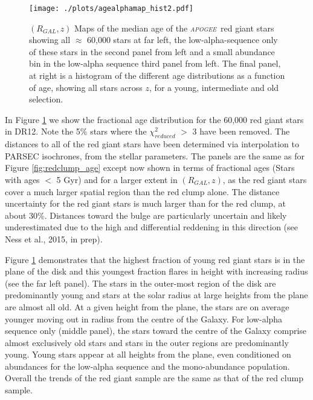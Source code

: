 \documentclass[12pt, preprint]{aastex}
\newcommand{\project}[1]{\textsl{#1}}
\newcommand{\apogee}{\project{\textsc{apogee}}}
\begin{document}
\begin{figure}[p]
\centering
              \texttt{[image: ./plots/agealphamap\_hist2.pdf]}
    \caption{$(R_{GAL},z)$ Maps of the median age of the \apogee\  red giant stars showing all $\approx$ 60,000 stars at far left, the low-alpha-sequence only of these stars in the second panel from left and a small abundance bin in the low-alpha sequence third panel from left. The final panel, at right is a histogram of the different age distributions as a function of age, showing all stars across $z$, for a young, intermediate and old selection.  }
\label{fig:allage}
\end{figure}

In Figure \ref{fig:allage} we show the fractional age distribution for the 60,000 red giant stars in DR12. Note the 5\% stars where the $\chi_{reduced}^2$ $>$ 3 have been removed. The distances to all of the red giant stars have been determined via interpolation to PARSEC isochrones, from the stellar parameters. The panels are the same as for Figure \ref{fig:redclump_age} except now shown in terms of fractional ages (Stars with ages $<$ 5 Gyr) and for a larger extent in $(R_{GAL},z)$, as the red giant stars cover a much larger spatial region than the red clump alone. The distance uncertainty for the red giant stars is much larger than for the red clump, at about 30\%. Distances toward the bulge are particularly uncertain and likely underestimated due to the high and differential reddening in this direction (see Ness et al., 2015, in prep).  

Figure \ref{fig:allage} demonstrates that the highest fraction of young red giant stars is in the plane of the disk and this youngest fraction flares in height with increasing radius (see the far left panel).  The stars in the outer-most region of the disk are predominantly young and stars at the solar radius at large heights from the plane are almost all old. At a given height from the plane, the stars are on average younger moving out in radius from the centre of the Galaxy. For low-alpha sequence only (middle panel), the stars toward the centre of the Galaxy comprise almost exclusively old stars and stars in the outer regions are predominantly young.  Young stars appear at all heights from the plane, even conditioned on abundances for the low-alpha sequence and the mono-abundance population. Overall the trends of the red giant sample are the same as that of the red clump sample. 
\end{document}
